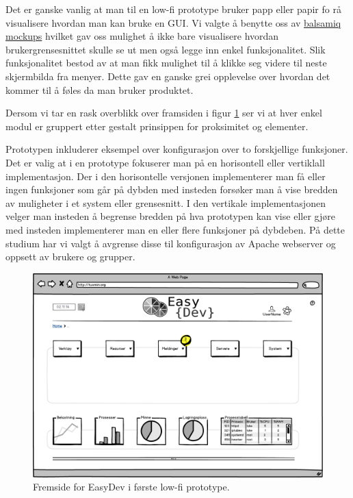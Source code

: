 Det er ganske vanlig at man til en low-fi prototype bruker papp eller papir fo rå visualisere hvordan man kan bruke en GUI. Vi valgte å benytte oss av \href{http://balsamiq.com/products/mockups/}{balsamiq mockups} hvilket gav oss mulighet å ikke bare visualisere hvordan brukergrensesnittet skulle se ut men også legge inn enkel funksjonalitet. Slik funksjonalitet bestod av at man fikk mulighet til å klikke seg videre til neste skjermbilda fra menyer. Dette gav en ganske grei opplevelse over hvordan det kommer til å føles da man bruker produktet.


Dersom vi tar en rask overblikk over framsiden i figur \ref{fig:lowfi_fremside} ser vi at hver enkel modul er gruppert etter gestalt prinsippen for proksimitet og elementer.\cite{forelesning:tulpesh}

Prototypen inkluderer eksempel over konfigurasjon over to forskjellige funksjoner.
Det er valig at i en prototype fokuserer man på en horisontell eller vertiklall implementasjon. Der i den horisontelle versjonen implementerer man få eller ingen funksjoner som går på dybden med insteden forsøker man å vise bredden av muligheter i et system eller grensesnitt. I den vertikale implementasjonen velger man insteden å begrense bredden på hva prototypen kan vise eller gjøre med insteden implementerer man en eller flere funksjoner på dybdeben.\cite{book:utforming}
På dette studium har vi valgt å avgrense disse til konfigurasjon av Apache webserver og oppsett av brukere og grupper. 

\begin{figure}
\includegraphics[width=\textwidth,height=\textheight,keepaspectratio]{./img/prosessdokumentasjon/lowfi/fremside.png}
\caption[Low-fi prototype]{Fremside for EasyDev i første low-fi prototype.}
\label{fig:lowfi_fremside}
\end{figure}


